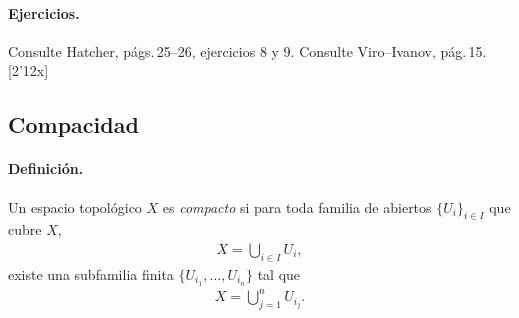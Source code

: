 \paragraph{\textbf{Ejercicios.}}

Consulte Hatcher, págs.\,25–26, ejercicios 8 y 9.  
Consulte Viro–Ivanov, pág.\,15. [2'12x]

\subsection{Compacidad}

\paragraph{\textbf{Definición.}}
Un espacio topológico $X$ es \emph{compacto} si para toda familia de abiertos $\{U_i\}_{i\in I}$ que cubre $X$,
\begin{align*}
X=\bigcup_{i\in I}U_i,
\end{align*}
existe una subfamilia finita $\{U_{i_1},\dots,U_{i_n}\}$ tal que
\begin{align*}
X=\bigcup_{j=1}^{n}U_{i_j}.
\end{align*}


